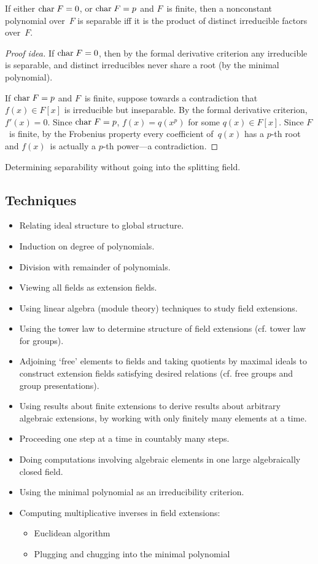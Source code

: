\begin{thm}[Separability]
If either \(\mathrel{\mathrm{char}} F=0\), or \(\mathrel{\mathrm{char}} F=p\) and \(F\)~is finite, then a nonconstant polynomial over~\(F\) is separable iff it is the product of distinct irreducible factors over~\(F\).
\end{thm}
\begin{proof}[Proof idea]
If \(\mathrel{\mathrm{char}} F=0\), then by the formal derivative criterion any irreducible is separable, and distinct irreducibles never share a root (by the minimal polynomial).

If \(\mathrel{\mathrm{char}} F=p\) and \(F\)~is finite, suppose towards a contradiction that \(f(x)\in F[x]\) is irreducible but inseparable. By the formal derivative criterion, \(f'(x)=0\). Since \(\mathrel{\mathrm{char}} F=p\), \(f(x)=q(x^p)\) for some \(q(x)\in F[x]\). Since \(F\)~is finite, by the Frobenius property every coefficient of~\(q(x)\) has a \(p\)-th root and \(f(x)\)~is actually a \(p\)-th power---a contradiction.
\end{proof}
\begin{app}
Determining separability without going into the splitting field.
\end{app}

\subsection*{Techniques}
\begin{itemize}[itemsep=0pt]
\item Relating ideal structure to global structure.
\item Induction on degree of polynomials.
\item Division with remainder of polynomials.
\item Viewing all fields as extension fields.
\item Using linear algebra (module theory) techniques to study field extensions.
\item Using the tower law to determine structure of field extensions (cf. tower law for groups).
\item Adjoining `free' elements to fields and taking quotients by maximal ideals to construct extension fields satisfying desired relations (cf. free groups and group presentations).
\item Using results about finite extensions to derive results about arbitrary algebraic extensions, by working with only finitely many elements at a time.
\item Proceeding one step at a time in countably many steps.
\item Doing computations involving algebraic elements in one large algebraically closed field.
\item Using the minimal polynomial as an irreducibility criterion.
\item Computing multiplicative inverses in field extensions:
\begin{itemize}[itemsep=0pt]
\item Euclidean algorithm
\item Plugging and chugging into the minimal polynomial
\end{itemize}
\end{itemize}
